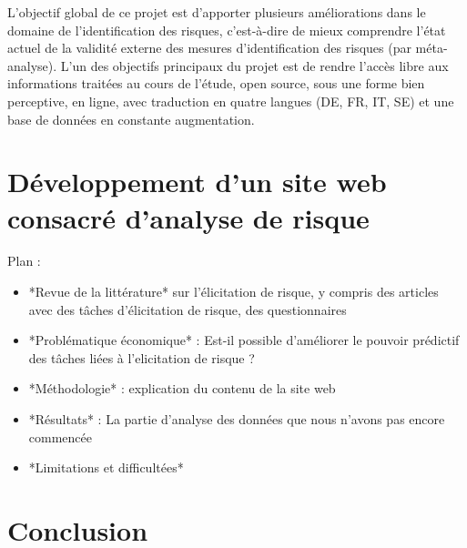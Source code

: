 \documentclass[12pt]{article}
\begin{document}
L'objectif global de ce projet est d'apporter plusieurs améliorations
dans le domaine de l'identification des risques, c'est-à-dire de mieux
comprendre l'état actuel de la validité externe des mesures
d'identification des risques (par méta-analyse). L'un des objectifs
principaux du projet est de rendre l'accès libre aux informations
traitées au cours de l'étude, open source, sous une forme bien
perceptive, en ligne, avec traduction en quatre langues (DE, FR, IT, SE)
et une base de données en constante augmentation.

\section{Développement d’un site web consacré d'analyse de risque}
\label{sec:fourth}

Plan :

\begin{itemize}
\item  *Revue de la littérature* sur l'élicitation de risque, y compris des articles avec des tâches d'élicitation de risque, des questionnaires

\item  *Problématique économique* : Est-il possible d'améliorer le pouvoir prédictif des tâches liées à l'elicitation de risque ?

\item *Méthodologie* : explication du contenu de la site web

\item *Résultats* : La partie d'analyse des données que nous n'avons pas encore commencée

\item *Limitations et difficultées*

\end{itemize}

\section{Conclusion}
\label{sec:fifth}



\end{document}
